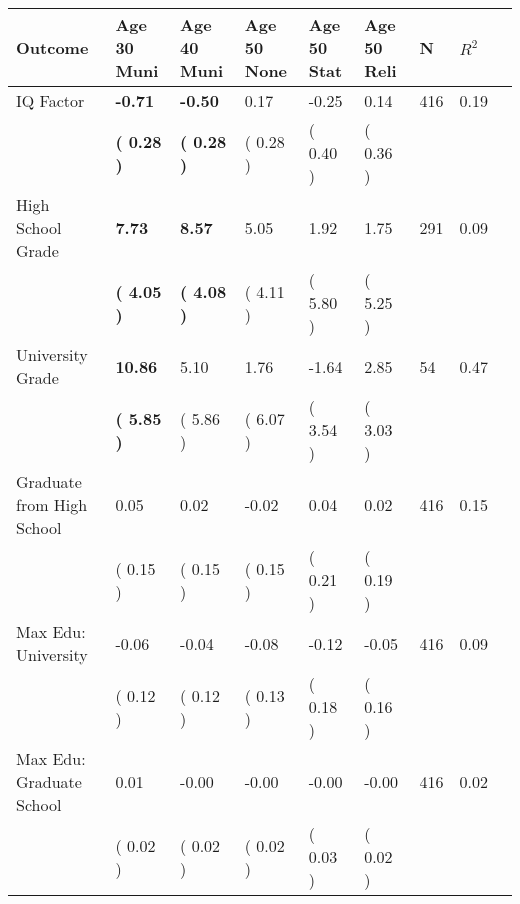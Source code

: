 \begin{tabular}{L{6.2cm} C{1.8cm} C{1.8cm} C{1.8cm} C{1.8cm} C{1.8cm} C{1.8cm} C{0.3cm} C{0.3cm}}
\toprule
 \textbf{Outcome} & \textbf{Age 30 Muni} & \textbf{Age 40 Muni} & \textbf{Age 50 None} & \textbf{Age 50 Stat} & \textbf{Age 50 Reli} & \textbf{N} & \textbf{$ R^2$} \\
\midrule
IQ Factor & \textbf{    -0.71} & \textbf{    -0.50} &      0.17 &     -0.25 &      0.14  & 416 &       0.19 \\ 
 & \textbf{(     0.28 )} & \textbf{(     0.28 )} & (     0.28 ) & (     0.40 ) & (     0.36 )  & \\
High School Grade & \textbf{     7.73} & \textbf{     8.57} &      5.05 &      1.92 &      1.75  & 291 &       0.09 \\ 
 & \textbf{(     4.05 )} & \textbf{(     4.08 )} & (     4.11 ) & (     5.80 ) & (     5.25 )  & \\
University Grade & \textbf{    10.86} &      5.10 &      1.76 &     -1.64 &      2.85  & 54 &       0.47 \\ 
 & \textbf{(     5.85 )} & (     5.86 ) & (     6.07 ) & (     3.54 ) & (     3.03 )  & \\
Graduate from High School &      0.05 &      0.02 &     -0.02 &      0.04 &      0.02  & 416 &       0.15 \\ 
 & (     0.15 ) & (     0.15 ) & (     0.15 ) & (     0.21 ) & (     0.19 )  & \\
Max Edu: University &     -0.06 &     -0.04 &     -0.08 &     -0.12 &     -0.05  & 416 &       0.09 \\ 
 & (     0.12 ) & (     0.12 ) & (     0.13 ) & (     0.18 ) & (     0.16 )  & \\
Max Edu: Graduate School &      0.01 &     -0.00 &     -0.00 &     -0.00 &     -0.00  & 416 &       0.02 \\ 
 & (     0.02 ) & (     0.02 ) & (     0.02 ) & (     0.03 ) & (     0.02 )  & \\
\bottomrule
\end{tabular}
